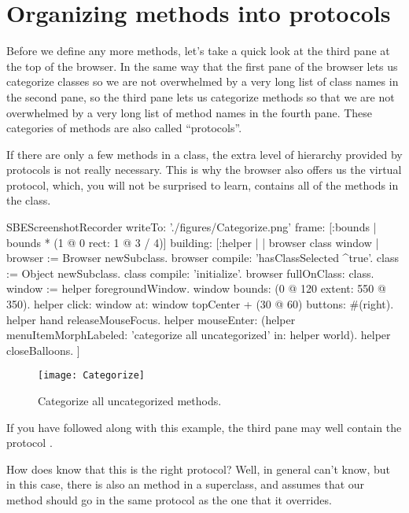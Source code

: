 \documentclass[a4paper,10pt,twoside]{book}
\begin{document}
\section{Organizing methods into protocols}

Before we define any more methods, let's take a quick look at the third pane at the top of the browser.
In the same way that the first pane of the browser lets us categorize classes so we are not overwhelmed by a very long list of class names in the second pane, so the third pane lets us categorize methods so that we are not overwhelmed by a very long list of method names in the fourth pane.  
These categories of methods are also called ``protocols''.

If there are only a few methods in a class, the extra level of hierarchy provided by protocols is not really necessary.
This is why the browser also offers us the  virtual protocol, which, you will not be surprised to learn, contains all of the methods in the class.

\begin{ExecuteSmalltalkScript}
SBEScreenshotRecorder writeTo: './figures/Categorize.png' frame: [:bounds | bounds * (1 @ 0 rect: 1 @ 3 / 4)] building: [:helper |
	| browser class window |
  browser := Browser newSubclass.
  browser compile: 'hasClassSelected ^true'.
  class := Object newSubclass.
  class compile: 'initialize'.
  browser fullOnClass: class.
  window := helper foregroundWindow.
  window bounds: (0 @ 120 extent: 550 @ 350).
  helper click: window at: window topCenter + (30 @ 60) buttons: #(right).
  helper hand releaseMouseFocus.
  helper mouseEnter: (helper menuItemMorphLabeled: 'categorize all uncategorized' in: helper world).
  helper closeBalloons.
]
\end{ExecuteSmalltalkScript}
\begin{figure}[htbp]
   \centering
   \texttt{[image: Categorize]} 
   \caption{Categorize all uncategorized methods.\label{fig:categorize}}
\end{figure}

If you have followed along with this example, the third pane may well contain the protocol .

How does \squeak{} know that this is the right protocol?
Well, in general \squeak{} can't know, but in this case, there is also an  method in a superclass, and \squeak assumes that our  method should go in the same protocol as the one that it overrides.
\end{document}
